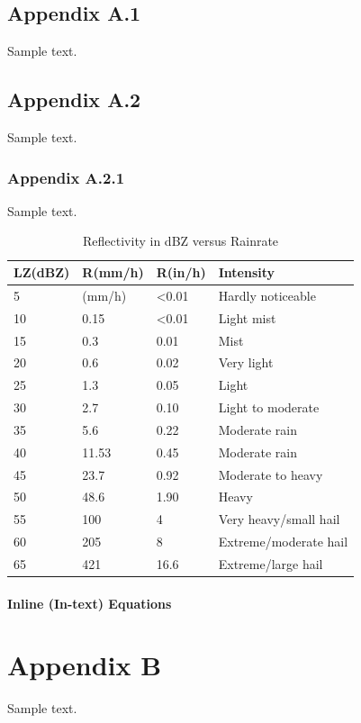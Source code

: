 \documentclass[acmtog, authorversion]{acmart}
\begin{document}
\subsection{Appendix A.1}
Sample text.
\subsection{Appendix A.2}
Sample text.
\subsubsection{Appendix A.2.1}
Sample text.

\begin{table}[]
\caption{Reflectivity in dBZ versus Rainrate}
\begin{tabular}{@{}llll@{}}
\toprule
LZ(dBZ) & R(mm/h) & R(in/h)        & Intensity             \\ \midrule
5       & (mm/h)  & \textless 0.01 & Hardly noticeable     \\
10      & 0.15    & \textless 0.01 & Light mist            \\
15      & 0.3     & 0.01           & Mist                  \\
20      & 0.6     & 0.02           & Very light            \\
25      & 1.3     & 0.05           & Light                 \\
30      & 2.7     & 0.10           & Light to moderate     \\
35      & 5.6     & 0.22           & Moderate rain         \\
40      & 11.53   & 0.45           & Moderate rain         \\
45      & 23.7    & 0.92           & Moderate to heavy     \\
50      & 48.6    & 1.90           & Heavy                 \\
55      & 100     & 4              & Very heavy/small hail \\
60      & 205     & 8              & Extreme/moderate hail \\
65      & 421     & 16.6           & Extreme/large hail    \\ \bottomrule
\end{tabular}
\end{table}

\paragraph{Inline (In-text) Equations}
\section{Appendix B}
Sample text.
\end{document}
